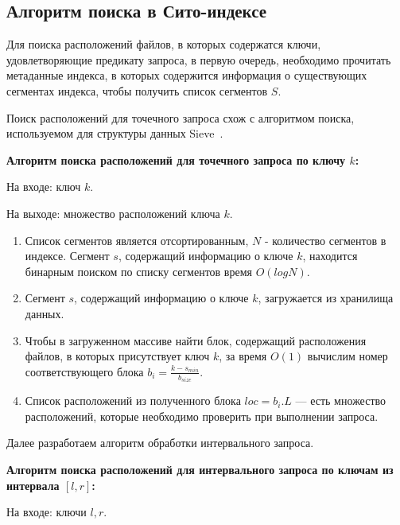 \subsection{Алгоритм поиска в Сито-индексе}\label{subsec:search}

Для поиска расположений файлов, в которых содержатся ключи, удовлетворяющие предикату запроса, в первую очередь, необходимо прочитать метаданные индекса, в которых содержится информация о существующих сегментах индекса, чтобы получить список сегментов $S$.

Поиск расположений для точечного запроса схож с алгоритмом поиска, используемом для структуры данных Sieve~\cite{Sieve}.

\textbf{Алгоритм поиска расположений для точечного запроса по ключу $k$:}

На входе: ключ $k$.

На выходе: множество расположений ключа $k$.
\begin{enumerate}
    \item Список сегментов является отсортированным, $N$ - количество сегментов в индексе. Сегмент $s$, содержащий информацию о ключе $k$, находится бинарным поиском по списку сегментов время $O(logN)$.
    \item Сегмент $s$, содержащий информацию о ключе $k$, загружается из хранилища данных.
    \item Чтобы в загруженном массиве найти блок, содержащий расположения файлов, в которых присутствует ключ $k$, за время $O(1)$ вычислим номер соответствующего блока $b_{i} = \frac{k - s_{min}}{b_{size}}$.
    \item Список расположений из полученного блока $loc = b_{i}.L$ --- есть множество расположений, которые необходимо проверить при выполнении запроса.
\end{enumerate}

Далее разработаем алгоритм обработки интервального запроса.

\textbf{Алгоритм поиска расположений для интервального запроса по ключам из интервала $[l, r]$:}

На входе: ключи $l, r$.

